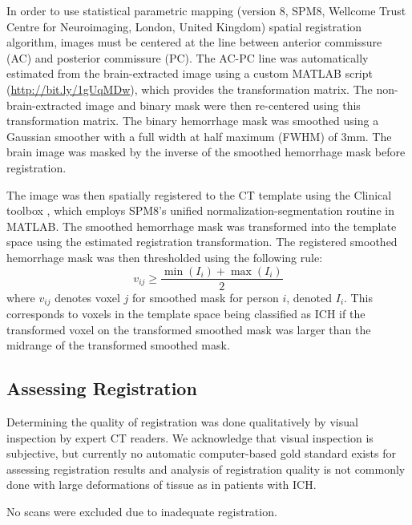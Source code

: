 \documentclass[10pt]{article}\usepackage[]{graphicx}\usepackage[]{color}
\begin{document}
In order to use statistical parametric mapping (version 8, SPM8, Wellcome Trust Centre for Neuroimaging, London, United Kingdom) spatial registration algorithm, images must be centered at the line between anterior commissure (AC) and posterior commissure (PC).  The AC-PC line was automatically estimated from the brain-extracted image using a custom MATLAB script (\url{http://bit.ly/1gUqMDw}), which provides the transformation matrix. 
The non-brain-extracted image and binary mask were then re-centered using this transformation matrix.  The binary hemorrhage mask was smoothed using a Gaussian smoother with a full width at half maximum (FWHM) of $3$mm.  The brain image was masked by the inverse of the smoothed hemorrhage mask before registration. 


The image was then spatially registered to the CT template using the Clinical toolbox \citep{rorden_age-specific_2012}, which employs SPM8's unified normalization-segmentation routine \citep{ashburner_unified_2005} in MATLAB.  The smoothed hemorrhage mask was transformed into the template space using the estimated registration transformation.  The registered smoothed hemorrhage mask was then thresholded using the following rule:
$$
v_{ij} ≥ \frac{\min(I_i) + \max(I_i)}{2}
$$
where $v_{ij}$ denotes voxel $j$ for smoothed mask for person $i$, denoted $I_i$.  This corresponds to voxels in the template space being classified as ICH if the transformed voxel on the transformed smoothed mask was larger than the midrange of the transformed smoothed mask.  


\subsection{Assessing Registration}

Determining the quality of registration was done qualitatively by visual inspection by expert CT readers.   We acknowledge that visual inspection is subjective, but currently no automatic computer-based gold standard exists for assessing
registration results and analysis of registration quality is not commonly done with large deformations of tissue as in patients with ICH.  

No scans were excluded due to inadequate registration.
\end{document}
